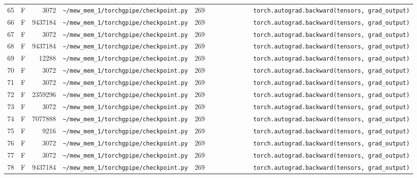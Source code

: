 \documentclass{article}
\begin{document}
\begin{longtable}{r l r p{6.5cm} r p{7.0cm}}
65 & F & 3072 & \lstinline|~/mew_mem_1/torchgpipe/checkpoint.py| & 269 & \lstinline|            torch.autograd.backward(tensors, grad_output)| \\
66 & F & 9437184 & \lstinline|~/mew_mem_1/torchgpipe/checkpoint.py| & 269 & \lstinline|            torch.autograd.backward(tensors, grad_output)| \\
67 & F & 3072 & \lstinline|~/mew_mem_1/torchgpipe/checkpoint.py| & 269 & \lstinline|            torch.autograd.backward(tensors, grad_output)| \\
68 & F & 9437184 & \lstinline|~/mew_mem_1/torchgpipe/checkpoint.py| & 269 & \lstinline|            torch.autograd.backward(tensors, grad_output)| \\
69 & F & 12288 & \lstinline|~/mew_mem_1/torchgpipe/checkpoint.py| & 269 & \lstinline|            torch.autograd.backward(tensors, grad_output)| \\
70 & F & 3072 & \lstinline|~/mew_mem_1/torchgpipe/checkpoint.py| & 269 & \lstinline|            torch.autograd.backward(tensors, grad_output)| \\
71 & F & 3072 & \lstinline|~/mew_mem_1/torchgpipe/checkpoint.py| & 269 & \lstinline|            torch.autograd.backward(tensors, grad_output)| \\
72 & F & 2359296 & \lstinline|~/mew_mem_1/torchgpipe/checkpoint.py| & 269 & \lstinline|            torch.autograd.backward(tensors, grad_output)| \\
73 & F & 3072 & \lstinline|~/mew_mem_1/torchgpipe/checkpoint.py| & 269 & \lstinline|            torch.autograd.backward(tensors, grad_output)| \\
74 & F & 7077888 & \lstinline|~/mew_mem_1/torchgpipe/checkpoint.py| & 269 & \lstinline|            torch.autograd.backward(tensors, grad_output)| \\
75 & F & 9216 & \lstinline|~/mew_mem_1/torchgpipe/checkpoint.py| & 269 & \lstinline|            torch.autograd.backward(tensors, grad_output)| \\
76 & F & 3072 & \lstinline|~/mew_mem_1/torchgpipe/checkpoint.py| & 269 & \lstinline|            torch.autograd.backward(tensors, grad_output)| \\
77 & F & 3072 & \lstinline|~/mew_mem_1/torchgpipe/checkpoint.py| & 269 & \lstinline|            torch.autograd.backward(tensors, grad_output)| \\
78 & F & 9437184 & \lstinline|~/mew_mem_1/torchgpipe/checkpoint.py| & 269 & \lstinline|            torch.autograd.backward(tensors, grad_output)| \\

\end{longtable}
\end{document}
